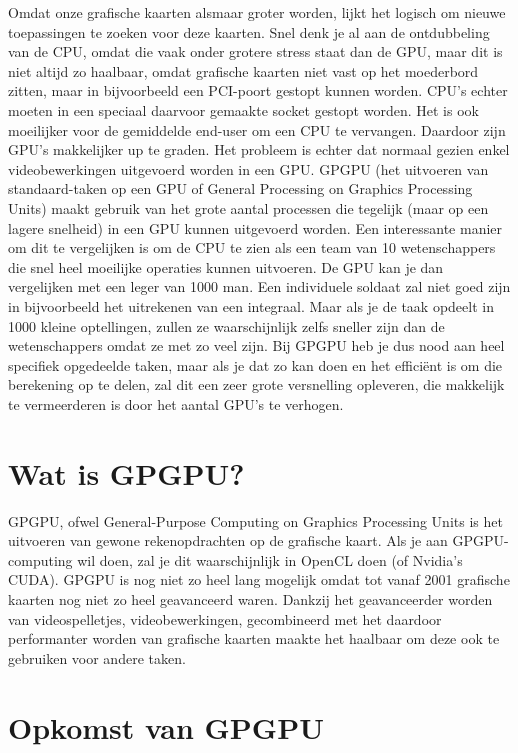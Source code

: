 \documentclass[11pt, a4paper]{article}
\begin{document}
Omdat onze grafische kaarten alsmaar groter worden, lijkt het logisch om nieuwe toepassingen te zoeken voor deze kaarten. Snel denk je al aan de ontdubbeling van de CPU, omdat die vaak onder grotere stress staat dan de GPU, maar dit is niet altijd zo haalbaar, omdat grafische kaarten niet vast op het moederbord zitten, maar in bijvoorbeeld een PCI-poort gestopt kunnen worden. CPU's echter moeten in een speciaal daarvoor gemaakte socket gestopt worden. Het is ook moeilijker voor de gemiddelde end-user om een CPU te vervangen. Daardoor zijn GPU's makkelijker up te graden. Het probleem is echter dat normaal gezien enkel videobewerkingen uitgevoerd worden in een GPU. GPGPU (het uitvoeren van standaard-taken op een GPU of General Processing on Graphics Processing Units) maakt gebruik van het grote aantal processen die tegelijk (maar op een lagere snelheid) in een GPU kunnen uitgevoerd worden. Een interessante manier om dit te vergelijken is om de CPU te zien als een team van 10 wetenschappers die snel heel moeilijke operaties kunnen uitvoeren. De GPU kan je dan vergelijken met een leger van 1000 man. Een individuele soldaat zal niet goed zijn in bijvoorbeeld het uitrekenen van een integraal. Maar als je de taak opdeelt in 1000 kleine optellingen, zullen ze waarschijnlijk zelfs sneller zijn dan de wetenschappers omdat ze met zo veel zijn. Bij GPGPU heb je dus nood aan heel specifiek opgedeelde taken, maar als je dat zo kan doen en het effici\"ent is om die berekening op te delen, zal dit een zeer grote versnelling opleveren, die makkelijk te vermeerderen is door het aantal GPU's te verhogen.\cite{gpgpu.org}

\newpage

\section{Wat is GPGPU?}

GPGPU, ofwel General-Purpose Computing on Graphics Processing Units is het uitvoeren van gewone rekenopdrachten op de grafische kaart. Als je aan GPGPU-computing wil doen, zal je dit waarschijnlijk in OpenCL doen (of Nvidia's CUDA). GPGPU is nog niet zo heel lang mogelijk omdat tot vanaf 2001 grafische kaarten nog niet zo heel geavanceerd waren. Dankzij het geavanceerder worden van videospelletjes, videobewerkingen, gecombineerd met het daardoor performanter worden van grafische kaarten maakte het haalbaar om deze ook te gebruiken voor andere taken.\cite{wikigpgpu}

\section{Opkomst van GPGPU}
\end{document}
